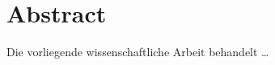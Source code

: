 
\chapter*{Abstract}
\label{cha:Abstract}

\thispagestyle{empty}


Die vorliegende wissenschaftliche Arbeit behandelt \dots